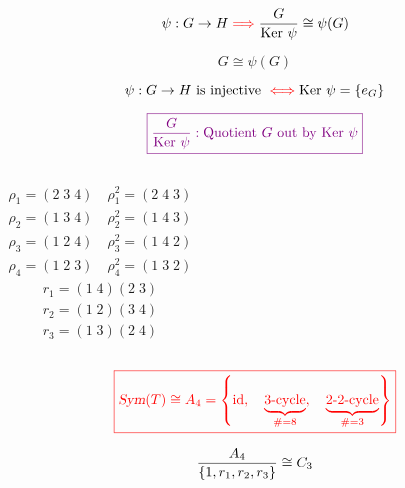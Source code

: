 \begin{frame}
  \begin{theorem}
	\[
	  \psi: G \to H \textcolor{red}{\implies} \frac{G}{\text{Ker } \psi} \cong \psi(G)
	\]
  \end{theorem}

  \pause
  \begin{center}
	 \pause
	\[
	  G \cong \psi(G)
	\]
	\pause
  \end{center}

  \pause
  \begin{theorem}
	\[
	  \psi: G \to H \text{ is injective } \textcolor{red}{\iff} \text{Ker } \psi = \left\{e_G\right\}
	\]
  \end{theorem}

  \pause
  \vspace{-0.80cm}
  \begin{center}
	\[
	  \textcolor{violet}{\boxed{\frac{G}{\text{Ker } \psi}: \text{Quotient } G \text{ out by } \text{Ker } \psi}}
	\]
  \end{center}
\end{frame}

\begin{frame}
  \begin{columns}
	  \begin{align*}
		\rho_{1} = (2\; 3\; 4)\quad \rho_{1}^{2} = (2\; 4\; 3) \\[3pt]
		\rho_{2} = (1\; 3\; 4)\quad \rho_{2}^{2} = (1\; 4\; 3) \\[3pt]
		\rho_{3} = (1\; 2\; 4)\quad \rho_{3}^{2} = (1\; 4\; 2) \\[3pt]
		\rho_{4} = (1\; 2\; 3)\quad \rho_{4}^{2} = (1\; 3\; 2)
	  \end{align*}
	  \begin{align*}
		r_1 = (1\; 4) (2\; 3) \\[6pt]
		r_2 = (1\; 2) (3\; 4) \\[6pt]
		r_3 = (1\; 3) (2\; 4)
	  \end{align*}
  \end{columns}

  \vspace{0.60cm}
  \[
	\textcolor{red}{\boxed{\textsl{Sym}(T) \cong A_4 = \left\{\text{id},\quad \underbrace{\text{3-cycle}}_{\# = 8},\quad \underbrace{\text{2-2-cycle}}_{\# = 3}\right\}}}
  \]

  \pause
  \[
	\frac{A_4}{\left\{1, r_1, r_2, r_3\right\}} \cong C_3
  \]
\end{frame}


